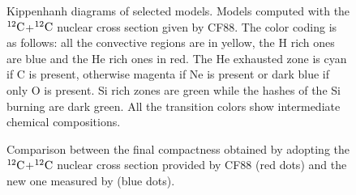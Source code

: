\documentclass{aastex631}
\newcommand\nuk[2]{$\rm ^{\rm #2} #1$}
\begin{document}
\begin{figure}[ht!]
\caption{Kippenhanh diagrams of selected models. Models computed with the \nuk{C}{12}+\nuk{C}{12} nuclear cross section given by CF88. The color coding is as follows: all the convective regions are in yellow, the H rich ones are blue and the He rich ones in red. The He exhausted zone is cyan if C is present, otherwise magenta if Ne is present or dark blue if only O is present. Si rich zones are green while the hashes of the Si burning are dark green. All the transition colors show intermediate chemical compositions.\label{fig:kipp2}}
\end{figure}

\begin{figure}[ht!]
\caption{Comparison between the final compactness obtained by adopting the \nuk{C}{12}+\nuk{C}{12} nuclear cross section provided by CF88 (red dots) and the new one measured by \cite{thm18} (blue dots).\label{fig:csi}}
\end{figure}
\end{document}
